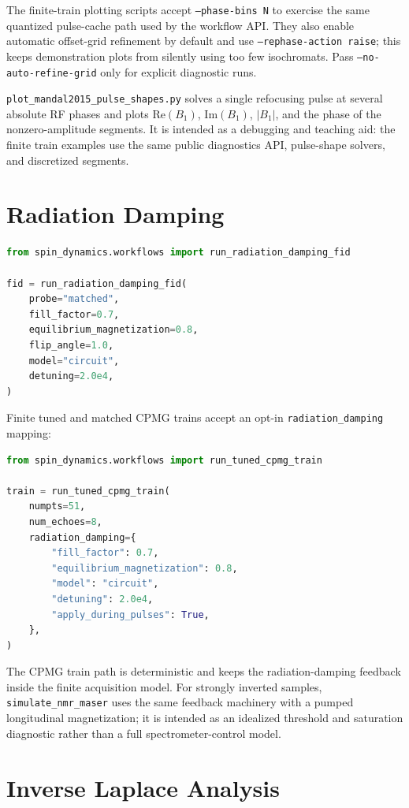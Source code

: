 \documentclass[11pt,oneside]{report}
\newcommand{\code}[1]{\texttt{#1}}
\begin{document}
The finite-train plotting scripts accept \code{--phase-bins N} to exercise the
same quantized pulse-cache path used by the workflow API.
They also enable automatic offset-grid refinement by default and use
\code{--rephase-action raise}; this keeps demonstration plots from silently
using too few isochromats.  Pass \code{--no-auto-refine-grid} only for explicit
diagnostic runs.

\code{plot\_mandal2015\_pulse\_shapes.py} solves a single refocusing pulse at
several absolute RF phases and plots \(\mathrm{Re}(B_1)\),
\(\mathrm{Im}(B_1)\), \(|B_1|\), and the phase of the nonzero-amplitude
segments.  It is intended as a debugging and teaching aid: the finite train
examples use the same public diagnostics API, pulse-shape solvers, and
discretized segments.

\section{Radiation Damping}

\begin{lstlisting}[language=Python]
from spin_dynamics.workflows import run_radiation_damping_fid

fid = run_radiation_damping_fid(
    probe="matched",
    fill_factor=0.7,
    equilibrium_magnetization=0.8,
    flip_angle=1.0,
    model="circuit",
    detuning=2.0e4,
)
\end{lstlisting}

Finite tuned and matched CPMG trains accept an opt-in
\code{radiation\_damping} mapping:

\begin{lstlisting}[language=Python]
from spin_dynamics.workflows import run_tuned_cpmg_train

train = run_tuned_cpmg_train(
    numpts=51,
    num_echoes=8,
    radiation_damping={
        "fill_factor": 0.7,
        "equilibrium_magnetization": 0.8,
        "model": "circuit",
        "detuning": 2.0e4,
        "apply_during_pulses": True,
    },
)
\end{lstlisting}

The CPMG train path is deterministic and keeps the radiation-damping feedback
inside the finite acquisition model. For strongly inverted samples,
\code{simulate\_nmr\_maser} uses the same feedback machinery with a pumped
longitudinal magnetization; it is intended as an idealized threshold and
saturation diagnostic rather than a full spectrometer-control model.

\section{Inverse Laplace Analysis}
\end{document}
